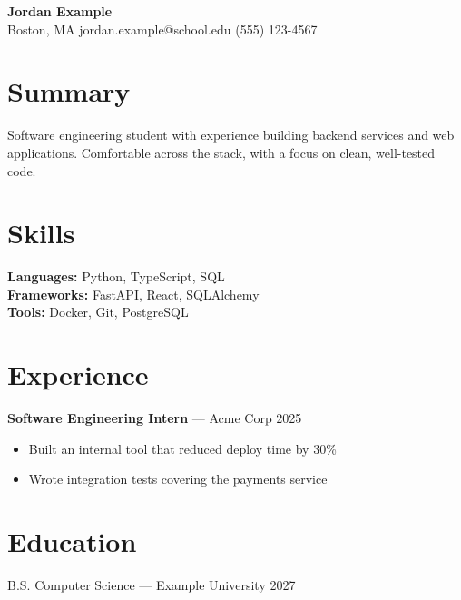 \documentclass[11pt]{article}
\begin{document}
\begin{center}
{\LARGE \textbf{Jordan Example}} \\
Boston, MA \quad jordan.example@school.edu \quad (555) 123-4567
\end{center}

\section*{Summary}
Software engineering student with experience building backend services and
web applications. Comfortable across the stack, with a focus on clean,
well-tested code.

\section*{Skills}
\textbf{Languages:} Python, TypeScript, SQL \\
\textbf{Frameworks:} FastAPI, React, SQLAlchemy \\
\textbf{Tools:} Docker, Git, PostgreSQL

\section*{Experience}
\textbf{Software Engineering Intern} --- Acme Corp \hfill 2025 \\
\begin{itemize}[nosep]
  \item Built an internal tool that reduced deploy time by 30\%
  \item Wrote integration tests covering the payments service
\end{itemize}

\section*{Education}
B.S. Computer Science --- Example University \hfill 2027
\end{document}
